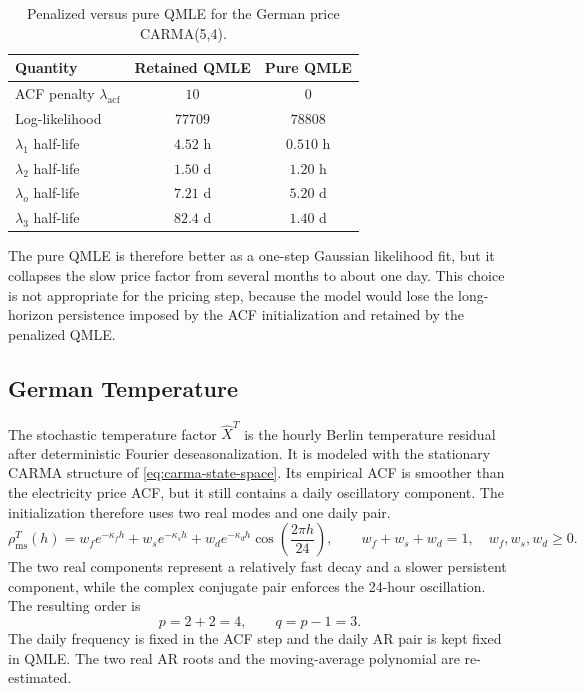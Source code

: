 \begin{table}[H]
  \centering
  \caption{Penalized versus pure QMLE for the German price CARMA(5,4).}
  \label{tab:price-pure-qmle-comparison}
  \begin{tabular}{@{}lcc@{}}
    \toprule
    Quantity & Retained QMLE & Pure QMLE \\
    \midrule
    ACF penalty \(\lambda_{\mathrm{acf}}\) & \(10\) & \(0\) \\
    Log-likelihood & \(77709\) & \(78808\) \\
    \(\lambda_1\) half-life & \(4.52\) h & \(0.510\) h \\
    \(\lambda_2\) half-life & \(1.50\) d & \(1.20\) h \\
    \(\lambda_o\) half-life & \(7.21\) d & \(5.20\) d \\
    \(\lambda_3\) half-life & \(82.4\) d & \(1.40\) d \\
    \bottomrule
  \end{tabular}
\end{table}

The pure QMLE is therefore better as a one-step Gaussian likelihood fit, but it
collapses the slow price factor from several months to about one day. This
choice is not appropriate for the pricing step, because the model would lose the
long-horizon persistence imposed by the ACF initialization and retained by the
penalized QMLE.

\FloatBarrier

\subsection{German Temperature}\label{ssec:german-temperature-carma-calibration}

The stochastic temperature factor \(\widehat X^T\) is the hourly Berlin
temperature residual after deterministic Fourier deseasonalization. It is
modeled with the stationary CARMA structure of \cref{eq:carma-state-space}. Its
empirical ACF is smoother than the electricity price ACF, but it still contains
a daily oscillatory component. The initialization therefore uses two real modes
and one daily pair.
\begin{equation}
  \rho_{\mathrm{ms}}^T(h)
  =
  w_f e^{-\kappa_f h}
  +
  w_s e^{-\kappa_s h}
  +
  w_d e^{-\kappa_d h}
  \cos\left(\frac{2\pi h}{24}\right),
  \qquad
  w_f+w_s+w_d=1,\quad w_f,w_s,w_d\ge 0 .
  \label{eq:temperature-multiscale-acf}
\end{equation}
The two real components represent a relatively fast decay and a slower
persistent component, while the complex conjugate pair enforces the 24-hour
oscillation. The resulting order is
\[
  p = 2 + 2 = 4,
  \qquad q=p-1=3 .
\]
The daily frequency is fixed in the ACF step and the daily AR pair is kept fixed
in QMLE. The two real AR roots and the moving-average polynomial are
re-estimated.

